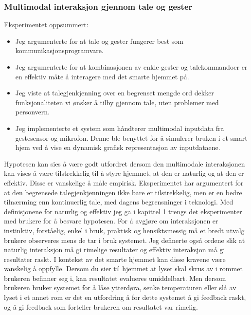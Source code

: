 \subsubsection*{Multimodal interaksjon gjennom tale og gester}
Eksperimentet oppsummert:
\begin{itemize}
\item Jeg argumenterte for at tale og gester fungerer best som kommunikasjonsprogramvare.
\item Jeg argumenterte for at kombinasjonen av enkle gester og talekommandoer er en effektiv måte å interagere med det smarte hjemmet på.
\item Jeg viste at talegjenkjenning over en begrenset mengde ord dekker funksjonaliteten vi ønsker å tilby gjennom tale, uten problemer med personvern.
\item Jeg implementerte et system som håndterer multimodal inputdata fra gestesensor og mikrofon. Denne ble benyttet for å simulerer bruken i et smart hjem ved å vise en dynamisk grafisk representasjon av inputdataene.
\end{itemize}
Hypotesen kan sies å være godt utfordret dersom den multimodale interaksjonen kan vises å være tilstrekkelig til å styre hjemmet, at den er naturlig og at den er effektiv. Disse er vanskelige å måle empirisk. Eksperimentet har argumentert for at den begrensede talegjenkjenningen ikke bare er tilstrekkelig, men er en bedre tilnærming enn kontinuerlig tale, med dagens begrensninger i teknologi. Med definisjonene for naturlig og effektiv jeg ga i kapittel 1 trengs det eksperimenter med brukere for å besvare hypotesen. For å avgjøre om interaksjonen er instinktiv, forståelig, enkel i bruk, praktisk og hensiktsmessig må et bredt utvalg brukere observeres mens de tar i bruk systemet. Jeg definerte også ordene slik at naturlig interaksjon må gi rimelige resultater og effektiv interaksjon må gi resultater raskt. I kontekst av det smarte hjemmet kan disse kravene være vanskelig å oppfylle. Dersom du sier til hjemmet at lyset skal skrus av i rommet brukeren befinner seg i, kan resultatet evalueres umiddelbart. Men dersom brukeren bruker systemet for å låse ytterdøra, senke temperaturen eller slå av lyset i et annet rom er det en utfordring å for dette systemet å gi feedback raskt, og å gi feedback som forteller brukeren om resultatet var rimelig.\\

